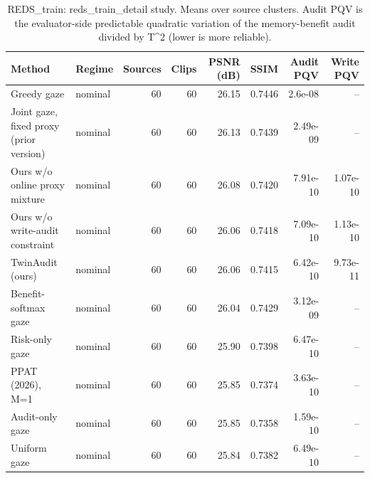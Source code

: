 \begin{table}[t]
\centering
\caption{REDS\_train: reds\_train\_detail study. Means over source clusters. Audit PQV is the evaluator-side predictable quadratic variation of the memory-benefit audit divided by T^2 (lower is more reliable).}
\label{tab:reds_train_detail_REDS_train}
\small
\begin{tabular}{llrrrrrr}
\toprule
Method & Regime & Sources & Clips & PSNR (dB) & SSIM & Audit PQV & Write PQV \\
\midrule
Greedy gaze & nominal & 60 & 60 & 26.15 & 0.7446 & 2.6e-08 & -- \\
Joint gaze, fixed proxy (prior version) & nominal & 60 & 60 & 26.13 & 0.7439 & 2.49e-09 & -- \\
Ours w/o online proxy mixture & nominal & 60 & 60 & 26.08 & 0.7420 & 7.91e-10 & 1.07e-10 \\
Ours w/o write-audit constraint & nominal & 60 & 60 & 26.06 & 0.7418 & 7.09e-10 & 1.13e-10 \\
TwinAudit (ours) & nominal & 60 & 60 & 26.06 & 0.7415 & 6.42e-10 & 9.73e-11 \\
Benefit-softmax gaze & nominal & 60 & 60 & 26.04 & 0.7429 & 3.12e-09 & -- \\
Risk-only gaze & nominal & 60 & 60 & 25.90 & 0.7398 & 6.47e-10 & -- \\
PPAT (2026), M=1 & nominal & 60 & 60 & 25.85 & 0.7374 & 3.63e-10 & -- \\
Audit-only gaze & nominal & 60 & 60 & 25.85 & 0.7358 & 1.59e-10 & -- \\
Uniform gaze & nominal & 60 & 60 & 25.84 & 0.7382 & 6.49e-10 & -- \\
\bottomrule
\end{tabular}
\end{table}
